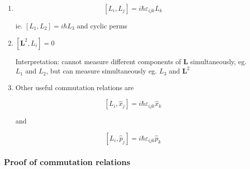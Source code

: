 \documentclass[a4paper]{article}
\begin{document}
\begin{enumerate}
	\item \[ [  L_{i},L_{j} ] = i \hbar \varepsilon_{ijk} L_{k} \]
	
	ie. $ [L_{1},L_{2}] = i \hbar L_{3} $ and cyclic perms
	
	\item $ [ \mathbf{L}^{2},L_{i} ] = 0 $
	
	
	Interpretation: cannot measure different components of $ \mathbf{L} $ simultaneously, eg. $ L_{1} $ and $ L_{2} $, but can measure simultaneously eg. $ L_{3} $ and $ \mathbf{L}^{2} $
	
	\item Other useful commutation relations are
	
	\[ [ L_{i}, \hat{x}_{j} ]  = i \hbar \varepsilon_{ijk} \hat{x}_{k}  \]
	
	and
	
	\[ [L_{i}, \hat{p}_{j} ]  = i \hbar \varepsilon_{ijk} \hat{p}_{k}  \]
	
\end{enumerate}

\subsubsection{Proof of commutation relations}
\end{document}
